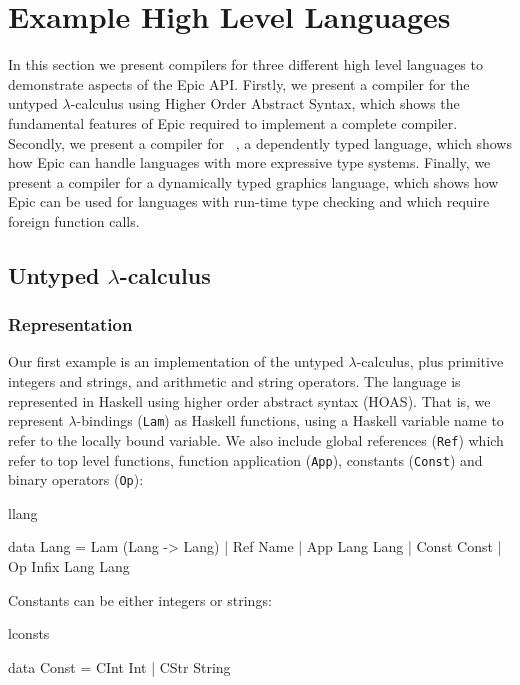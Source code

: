\section{Example High Level Languages}

In this section we present compilers for three different high level
languages to demonstrate aspects of the Epic API. Firstly, we present
a compiler for the untyped $\lambda$-calculus using Higher Order
Abstract Syntax, which shows the fundamental features of Epic required
to implement a complete compiler. Secondly, we present a compiler for 
\LamPi{}~\cite{simply-easy}, a dependently typed language, which shows
how Epic can handle languages with more expressive type
systems. Finally, we present a compiler for a dynamically typed
graphics language, which shows how Epic can be used for languages with
run-time type checking and which require foreign function calls.

\subsection{Untyped $\lambda$-calculus}

\subsubsection{Representation}

Our first example is an implementation of the untyped
$\lambda$-calculus, plus primitive integers and strings, and
arithmetic and string operators. The language is represented in
Haskell using higher order abstract syntax (HOAS).  That is, we
represent $\lambda$-bindings (\texttt{Lam}) as Haskell functions,
using a Haskell variable name to refer to the locally bound
variable. We also include global references (\texttt{Ref}) which refer
to top level functions, function application (\texttt{App}), constants
(\texttt{Const}) and binary operators (\texttt{Op}):

\begin{SaveVerbatim}{llang}

data Lang = Lam (Lang -> Lang)
          | Ref Name
          | App Lang Lang
          | Const Const
          | Op Infix Lang Lang

\end{SaveVerbatim}

\noindent
Constants can be either integers or strings:

\begin{SaveVerbatim}{lconsts}

data Const = CInt Int
           | CStr String

\end{SaveVerbatim}

